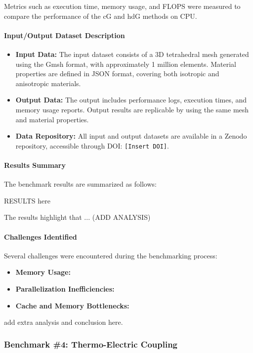 Metrics such as execution time, memory usage, and FLOPS were measured to compare the performance of the cG and hdG methods on CPU.

\paragraph{Input/Output Dataset Description}
\begin{itemize}
    \item \textbf{Input Data:} The input dataset consists of a 3D tetrahedral mesh generated using the Gmsh format, with approximately 1 million elements. Material properties are defined in JSON format, covering both isotropic and anisotropic materials.

    \item \textbf{Output Data:} The output includes performance logs, execution times, and memory usage reports. Output results are replicable by using the same mesh and material properties.

    \item \textbf{Data Repository:} All input and output datasets are available in a Zenodo repository, accessible through DOI: \texttt{[Insert DOI]}.
\end{itemize}


\paragraph{Results Summary}
The benchmark results are summarized as follows:

RESULTS here

The results highlight that ... (ADD ANALYSIS)




\paragraph{Challenges Identified}
Several challenges were encountered during the benchmarking process:
\begin{itemize}
    \item \textbf{Memory Usage:}
    \item \textbf{Parallelization Inefficiencies:}
    \item \textbf{Cache and Memory Bottlenecks:}
\end{itemize}

add extra analysis  and conclusion here.
\fi

\subsubsection{Benchmark \#4: Thermo-Electric Coupling}
\label{sec:WP1:Feelpp:benchmark:hl-31}

